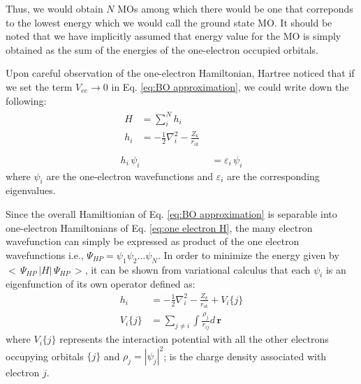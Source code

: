             Thus, we would obtain $N$ MOs among which there would be one that correponds to the lowest energy which we would call the ground state MO. It should be noted that we have implicitly assumed that energy value for the MO is simply obtained as the sum of the energies of the one-electron occupied orbitals.

            Upon careful observation of the one-electron Hamiltonian, Hartree noticed that if we set the term $V_{ee} \to 0$ in Eq. \eqref{eq:BO approximation}, we could write down the following:
            \begin{subequations}
                \begin{align}
                    \begin{split}
                        H &= \displaystyle\sum_i^N h_i\\
                        h_i &= -\frac{1}{2} \nabla^2_i - \frac{Z_k}{r_{ik}} \label{eq:one electron H}\\
                    \end{split}\\
                    h_i\,\psi_i\, &= \varepsilon_i \, \psi_i \label{eq:one electron SE}
                \end{align}
            \end{subequations}
            where $\psi_i$ are the one-electron wavefunctions and $\varepsilon_i$ are the corresponding eigenvalues.

            Since the overall Hamiltionian of Eq. \eqref{eq:BO approximation} is separable into one-electron Hamiltonians of Eq. \eqref{eq:one electron H}, the many electron wavefunction can simply be expressed as product of the one electron wavefunctions i.e., $\Psi_{HP} = \psi_1 \psi_2 \ldots \psi_N$. In order to minimize the energy given by $<\,\Psi_{HP}\, | H |\,\Psi_{HP}\,>$, it can be shown from variational calculus that each $\psi_i$ is an eigenfunction of its own operator defined as:
            \begin{equation}\label{eq:correct Hamiltonian}
                \begin{aligned}
                    h_i &= -\frac{1}{2} \nabla^2_i - \frac{Z_k}{r_{ik}} + V_i \{j\}\\
                    V_i \{j\} &= \displaystyle\sum_{j \ne i} \int \frac{\rho_j}{r_{ij}} d\,\mathbf{r}
                \end{aligned}
            \end{equation}
            where $V_i \{j\}$ represents the interaction potential with all the other electrons occupying orbitals $\{j\}$ and $\rho_j = |\psi_j|^2$; is the charge density associated with electron $j$.

